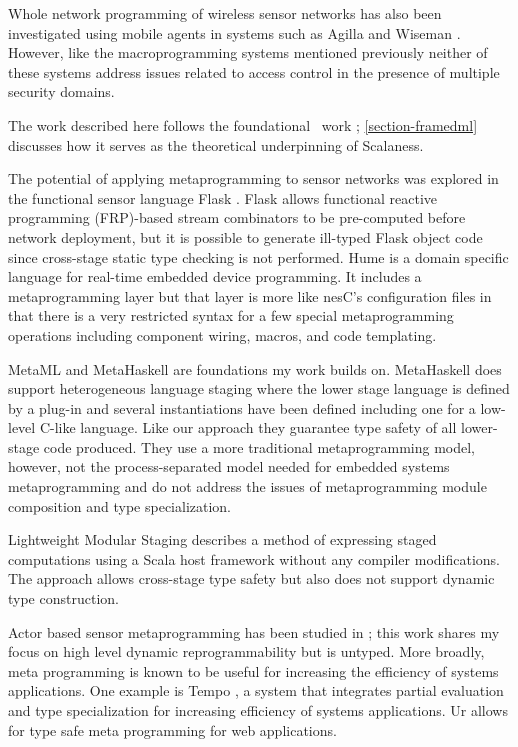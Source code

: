 Whole network programming of wireless sensor networks has also been investigated using mobile
agents in systems such as Agilla \cite{Fok:2009:AMA:1552297.1552299} and Wiseman
\cite{Gonzalez-Valenzuela:2010:PMW:1891545.1891566}. However, like the macro\-programming
systems mentioned previously neither of these systems address issues related to access control
in the presence of multiple security domains.


The work described here follows the foundational \fml\ work \cite{FramedML};
\autoref{section-framedml} discusses how it serves as the theoretical underpinning of Scalaness.

The potential of applying metaprogramming to sensor networks was explored in the functional
sensor language Flask \cite{Mainland-Flask-2008}. Flask allows functional reactive programming
(FRP)-based stream combinators to be pre-computed before network deployment, but it is possible
to generate ill-typed Flask object code since cross-stage static type checking is not performed.
Hume \cite{Hume} is a domain specific language for real-time embedded device programming. It
includes a metaprogramming layer but that layer is more like nesC's configuration files in that
there is a very restricted syntax for a few special metaprogramming operations including
component wiring, macros, and code templating.

MetaML \cite{Taha-MetaML,DBLP:conf/icess/Taha04} and MetaHaskell \cite{mainland12} are
foundations my work builds on. MetaHaskell does support heterogeneous language staging where the
lower stage language is defined by a plug-in and several instantiations have been defined
including one for a low-level C-like language. Like our approach they guarantee type safety of
all lower-stage code produced. They use a more traditional metaprogramming model, however, not
the process-separated model needed for embedded systems metaprogramming and do not address the
issues of metaprogramming module composition and type specialization.

Lightweight Modular Staging \cite{Rompf-LMS} describes a method of expressing staged
computations using a Scala host framework without any compiler modifications. The approach
allows cross-stage type safety but also does not support dynamic type construction.

Actor based sensor metaprogramming has been studied in \cite{cheong07}; this work shares my
focus on high level dynamic reprogrammability but is untyped. More broadly, meta programming is
known to be useful for increasing the efficiency of systems applications. One example is Tempo
\cite{289140}, a system that integrates partial evaluation and type specialization for
increasing efficiency of systems applications. Ur \cite{UrPLDI10} allows for type safe meta
programming for web applications.

